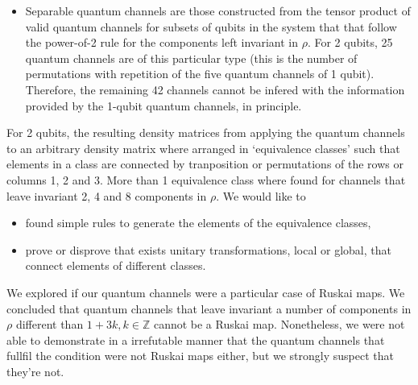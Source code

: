 \documentclass[11pt,dvipsnames]{article}
\begin{document}
\begin{itemize}
%


	\item Separable quantum channels are those constructed from the tensor product
				of valid quantum channels for subsets of qubits in the system that
				that follow the 
				power-of-2 rule for the components left invariant in $\rho$. For 2
				qubits, 25 quantum channels are of this particular type (this is the
				number of permutations with repetition of the five 
				quantum channels of 1 qubit). Therefore, the remaining 42 channels
				cannot be infered with the information provided by the 1-qubit
				quantum channels, in principle.
\end{itemize}

For 2 qubits, 
the resulting density matrices from applying the quantum channels
to an arbitrary density matrix where arranged in `equivalence classes' 
such that elements in a class are connected by tranposition or 
permutations of the rows or columns 1, 2 and 3. More than 1 equivalence class
where found for channels that leave invariant 2, 4 and 8 components in $\rho$.
We would like to
\begin{itemize}
	\item found simple rules to generate the elements 
				of the equivalence classes,
	\item prove or disprove that exists unitary transformations, local or global,
				that connect elements of different classes.
\end{itemize}

We explored if our quantum channels were a particular case of Ruskai maps. 
We concluded that quantum channels that leave invariant a number of components
in $\rho$ different than $1+3k, k\in \mathbb{Z}$ cannot be a Ruskai map. 
Nonetheless, we were not able to demonstrate in a irrefutable manner that 
the quantum channels that fullfil the condition were not Ruskai maps either, 
but we strongly suspect that they're not.
\end{document}
